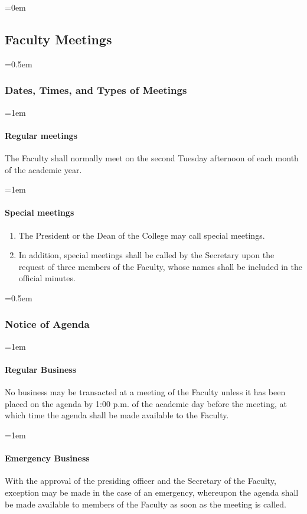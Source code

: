 \documentclass{manual}
\let\oldsubsection\subsection
\renewcommand\subsection{\leftskip=0em\oldsubsection}
\let\oldsubsubsection\subsubsection
\renewcommand\subsubsection{\leftskip=0.5em\oldsubsubsection}
\let\oldparagraph\paragraph
\renewcommand\paragraph{\leftskip=1em\oldparagraph}
\newcommand{\itemLevelA}{\alph*.}
\newcommand{\itemRefA}{\alph*}
\begin{document}
\subsection{Faculty Meetings} \label{sec:FacultyMeetings}
\subsubsection{Dates, Times, and Types of Meetings}

\paragraph{Regular meetings} 
The Faculty shall normally meet on the second Tuesday afternoon of each month of the academic year. 

\paragraph{Special meetings}
\begin{enumerate}[label=\itemLevelA,ref=\itemRefA]
\item The President or the Dean of the College may call special meetings.
\item In addition, special meetings shall be called by the Secretary upon the request of three members of the Faculty, whose names shall be included in the official minutes.
\end{enumerate}

\subsubsection{Notice of Agenda}

\paragraph{Regular Business} 
No business may be transacted at a meeting of the Faculty unless it has been placed on the agenda by 1:00 p.m. of the academic day before the meeting, at which time the agenda shall be made available to the Faculty.

\paragraph{Emergency Business} 
With the approval of the presiding officer and the Secretary of the Faculty, exception may be made in the case of an emergency, whereupon the agenda shall be made available to members of the Faculty as soon as the meeting is called.
\end{document}
